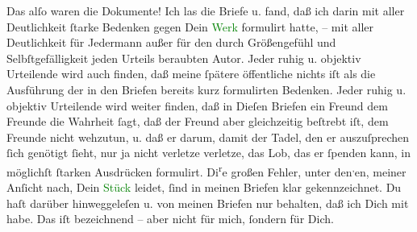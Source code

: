 \pstart
           Das alſo waren die Dokumente! Ich las die Briefe u. fand, daß ich darin mit aller
               Deutlichkeit ſtarke Bedenken gegen Dein \textcolor{green}{Werk}{}\ledrightnote{{$\rightarrow$}\textcolor{green}{Der Schleier der Beatrice. Schauspiel in fünf Akten}} formulirt hatte, – mit aller Deutlichkeit für Jedermann
               außer für {\pb}den durch Größengefühl und
               Selbſtgefälligkeit jeden Urteils beraubten Autor. Jeder ruhig u. objektiv Urteilende
               wird auch finden, daß meine ſpätere öffentliche \label{K_L03475-3v}\label{K_L03475-3h} nichts iſt als die Ausführung der in den
               Briefen bereits kurz formulirten Bedenken. Jeder ruhig u. objektiv Urteilende wird
               weiter finden, daß in Dieſen Briefen ein Freund dem Freunde die Wahrheit ſagt, \strikeout{\textcolor{gray}{×}\-\textcolor{gray}{×}} daß der Freund aber gleichzeitig beſtrebt iſt, dem Freunde nicht wehzutun, u.
               daß er darum, damit der Tadel, den er auszuſprechen ſich genötigt ſieht, nur ja nicht
               verletze  verletze, \strikeout{\textcolor{gray}{d}\textcolor{gray}{×}\-\textcolor{gray}{×}} das Lob, das er ſpenden kann, in möglichſt ſtarken Ausdrücken formulirt. {\pb}Di\substVorne{}\textsuperscript{r}\substDazwischen{}e\substHinten{} großen Fehler, unter den\substVorne{}\textsuperscript{,}\substDazwischen{}en,\substHinten{} meiner Anſicht nach, Dein \textcolor{green}{Stück}{}\ledrightnote{{$\rightarrow$}\textcolor{green}{Der Schleier der Beatrice. Schauspiel in fünf Akten}} leidet, ſind in meinen Briefen klar gekennzeichnet. Du haſt darüber
               hinweggeleſen u. von meinen Briefen nur behalten, daß ich Dich mit \label{K_L03475-4v}\label{K_L03475-4h} habe. Das iſt bezeichnend – aber nicht für mich, ſondern für Dich.\pend
           

